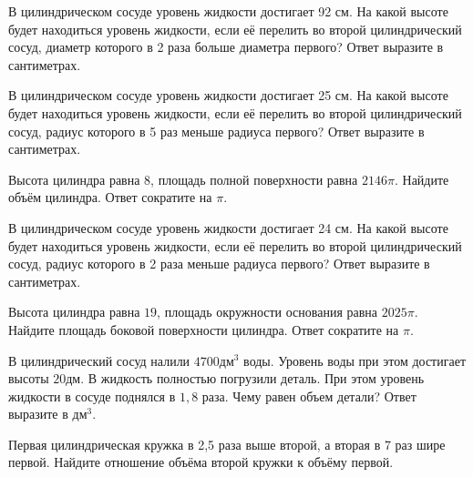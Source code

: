 \documentclass[4apaper]{article}
\begin{document}
\begin{taskBN}{57}
В цилиндрическом сосуде уровень жидкости достигает 92 см. На какой высоте будет находиться уровень жидкости, если её перелить во второй цилиндрический сосуд, диаметр которого в 2 раза больше диаметра первого? Ответ выразите в сантиметрах.
\end{taskBN}

\begin{taskBN}{58}
В цилиндрическом сосуде уровень жидкости достигает 25 см. На какой высоте будет находиться уровень жидкости, если её перелить во второй цилиндрический сосуд, радиус которого в 5 раз меньше радиуса первого? Ответ выразите в сантиметрах.
\end{taskBN}

\begin{taskBN}{59}
Высота цилиндра равна $8$, площадь полной поверхности равна $2146\pi$. Найдите объём цилиндра. Ответ сократите на $\pi$.
\end{taskBN}

\begin{taskBN}{60}
В цилиндрическом сосуде уровень жидкости достигает 24 см. На какой высоте будет находиться уровень жидкости, если её перелить во второй цилиндрический сосуд, радиус которого в 2 раза меньше радиуса первого? Ответ выразите в сантиметрах.
\end{taskBN}

\begin{taskBN}{61}
Высота цилиндра равна $19$, площадь окружности основания равна $2025\pi$. Найдите площадь боковой поверхности цилиндра. Ответ сократите на $\pi$.
\end{taskBN}

\begin{taskBN}{62}
В цилиндрический сосуд налили $4700\mbox{дм}^3$ воды. Уровень воды при этом достигает высоты $20$дм. В жидкость полностью погрузили деталь. При этом уровень жидкости в сосуде поднялся в $ 1{,}8 $ раза. Чему равен объем детали? Ответ выразите в $\mbox{дм}^3$.
\end{taskBN}

\begin{taskBN}{63}
 Первая цилиндрическая кружка в 2,5 раза выше второй, а вторая в 7 раз шире первой. Найдите отношение объёма второй кружки к объёму первой.
\end{taskBN}
\end{document}
